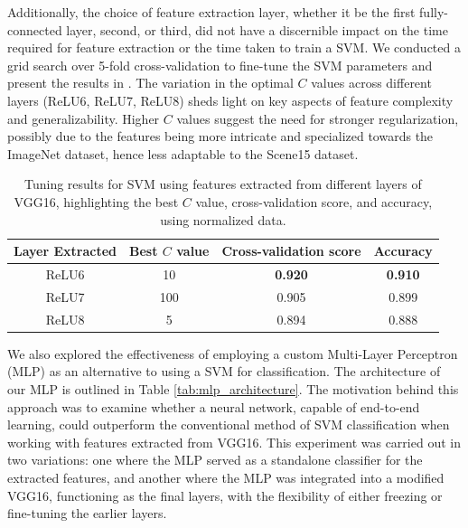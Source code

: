 Additionally, the choice of feature extraction layer, whether it be the first fully-connected layer, second, or third, did not have a discernible impact on the time required for feature extraction or the time taken to train a SVM. We conducted a grid search over 5-fold cross-validation to fine-tune the SVM parameters and present the results in . The variation in the optimal $C$ values across different layers (ReLU6, ReLU7, ReLU8) sheds light on key aspects of feature complexity and generalizability. Higher $C$ values suggest the need for stronger regularization, possibly due to the features being more intricate and specialized towards the ImageNet dataset, hence less adaptable to the Scene15 dataset.

\begin{table}[H]
    \centering
    \begin{tabular}{@{}cccc@{}}
        \toprule
        \textbf{Layer Extracted} & \textbf{Best $C$ value} & \textbf{Cross-validation score} & \textbf{Accuracy} \\
        \midrule \midrule
        ReLU6                    & 10                     & \textbf{0.920}                  & \textbf{0.910}    \\
        ReLU7                    & 100                     & 0.905                           & 0.899             \\
        ReLU8                    & 5                       & 0.894                           & 0.888             \\
        \bottomrule
    \end{tabular}
    \caption{Tuning results for SVM using features extracted from different layers of VGG16, highlighting the best $C$ value, cross-validation score, and accuracy, using normalized data.}
    \label{tab:svm_tuned}
\end{table}

We also explored the effectiveness of employing a custom Multi-Layer Perceptron (MLP) as an alternative to using a SVM for classification. The architecture of our MLP is outlined in Table \ref{tab:mlp_architecture}. The motivation behind this approach was to examine whether a neural network, capable of end-to-end learning, could outperform the conventional method of SVM classification when working with features extracted from VGG16. This experiment was carried out in two variations: one where the MLP served as a standalone classifier for the extracted features, and another where the MLP was integrated into a modified VGG16, functioning as the final layers, with the flexibility of either freezing or fine-tuning the earlier layers.

